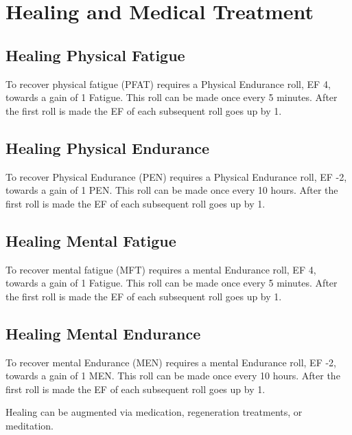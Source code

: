 \chapter{Healing and Medical Treatment}

\section{Healing Physical Fatigue}

To recover physical fatigue (PFAT) requires a Physical Endurance 
roll,  EF 4, towards a gain of 1 Fatigue. This roll can be made once 
every 5 minutes. After the first roll is made the EF of each 
subsequent roll goes up by 1. 

\section{Healing Physical Endurance}

To recover Physical Endurance (PEN) requires a Physical Endurance 
roll, EF -2, towards a gain of 1 PEN.  This roll can be made once 
every 10 hours. After the first roll is made the EF of each 
subsequent roll goes up by 1. 

\section{Healing Mental Fatigue}

To recover mental fatigue (MFT) requires a mental Endurance 
roll,  EF 4, towards a gain of 1 Fatigue. This roll can be made once 
every 5 minutes. After the first roll is made the EF of each 
subsequent roll goes up by 1. 

\section{Healing Mental Endurance}

To recover mental Endurance (MEN) requires a mental Endurance 
roll, EF -2, towards a gain of 1 MEN.  This roll can be made once 
every 10 hours. After the first roll is made the EF of each 
subsequent roll goes up by 1. 

Healing can be augmented via medication, regeneration treatments, or 
meditation. 



